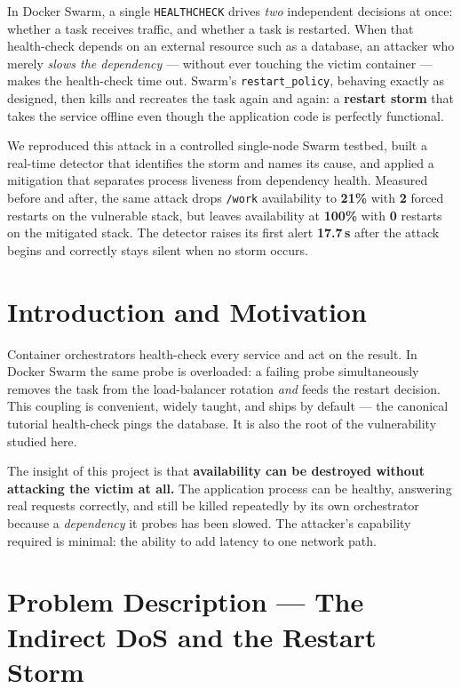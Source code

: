 \documentclass[11pt]{article}
\begin{document}
In Docker Swarm, a single \texttt{HEALTHCHECK} drives \emph{two} independent
decisions at once: whether a task receives traffic, and whether a task is
restarted. When that health-check depends on an external resource such as a
database, an attacker who merely \emph{slows the dependency} --- without ever
touching the victim container --- makes the health-check time out. Swarm's
\texttt{restart\_policy}, behaving exactly as designed, then kills and recreates
the task again and again: a \textbf{restart storm} that takes the service
offline even though the application code is perfectly functional.

We reproduced this attack in a controlled single-node Swarm testbed, built a
real-time detector that identifies the storm and names its cause, and applied a
mitigation that separates process liveness from dependency health. Measured
before and after, the same attack drops \texttt{/work} availability to
\textbf{21\%} with \textbf{2} forced restarts on the vulnerable stack, but leaves
availability at \textbf{100\%} with \textbf{0} restarts on the mitigated stack.
The detector raises its first alert \textbf{17.7\,s} after the attack begins and
correctly stays silent when no storm occurs.

\section{Introduction and Motivation}

Container orchestrators health-check every service and act on the result. In
Docker Swarm the same probe is overloaded: a failing probe simultaneously
removes the task from the load-balancer rotation \emph{and} feeds the restart
decision. This coupling is convenient, widely taught, and ships by default ---
the canonical tutorial health-check pings the database. It is also the root of
the vulnerability studied here.

The insight of this project is that \textbf{availability can be destroyed
without attacking the victim at all.} The application process can be healthy,
answering real requests correctly, and still be killed repeatedly by its own
orchestrator because a \emph{dependency} it probes has been slowed. The
attacker's capability required is minimal: the ability to add latency to one
network path.

\section{Problem Description --- The Indirect DoS and the Restart Storm}
\end{document}
